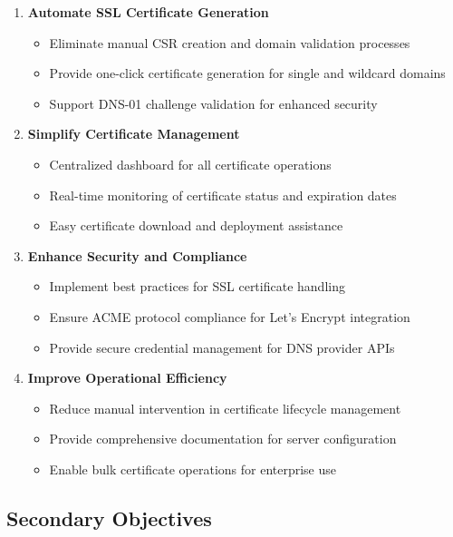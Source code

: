 \begin{enumerate}
    \item \textbf{Automate SSL Certificate Generation}
    \begin{itemize}
        \item Eliminate manual CSR creation and domain validation processes
        \item Provide one-click certificate generation for single and wildcard domains
        \item Support DNS-01 challenge validation for enhanced security
    \end{itemize}
    
    \item \textbf{Simplify Certificate Management}
    \begin{itemize}
        \item Centralized dashboard for all certificate operations
        \item Real-time monitoring of certificate status and expiration dates
        \item Easy certificate download and deployment assistance
    \end{itemize}
    
    \item \textbf{Enhance Security and Compliance}
    \begin{itemize}
        \item Implement best practices for SSL certificate handling
        \item Ensure ACME protocol compliance for Let's Encrypt integration
        \item Provide secure credential management for DNS provider APIs
    \end{itemize}
    
    \item \textbf{Improve Operational Efficiency}
    \begin{itemize}
        \item Reduce manual intervention in certificate lifecycle management
        \item Provide comprehensive documentation for server configuration
        \item Enable bulk certificate operations for enterprise use
    \end{itemize}
\end{enumerate}

\subsection{Secondary Objectives}


